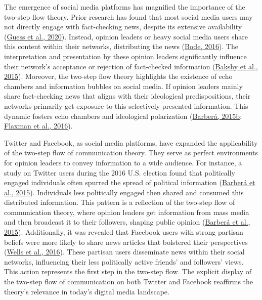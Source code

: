 \documentclass[
  12pt,
]{article}
\begin{document}
The emergence of social media platforms has magnified the importance of
the two-step flow theory. Prior research has found that most social
media users may not directly engage with fact-checking news, despite its
extensive availability (\protect\hyperlink{ref-guess2020exposure}{Guess
et al., 2020}). Instead, opinion leaders or heavy social media users
share this content within their networks, distributing the news
(\protect\hyperlink{ref-bode2016political}{Bode, 2016}). The
interpretation and presentation by these opinion leaders significantly
influence their network's acceptance or rejection of fact-checked
information (\protect\hyperlink{ref-bakshy2015exposure}{Bakshy et al.,
2015}). Moreover, the two-step flow theory highlights the existence of
echo chambers and information bubbles on social media. If opinion
leaders mainly share fact-checking news that aligns with their
ideological predispositions, their networks primarily get exposure to
this selectively presented information. This dynamic fosters echo
chambers and ideological polarization
(\protect\hyperlink{ref-barbera2015social}{Barberá, 2015b};
\protect\hyperlink{ref-flaxman2016filter}{Flaxman et al., 2016}).

Twitter and Facebook, as social media platforms, have expanded the
applicability of the two-step flow of communication theory. They serve
as perfect environments for opinion leaders to convey information to a
wide audience. For instance, a study on Twitter users during the 2016
U.S. election found that politically engaged individuals often spurred
the spread of political information
(\protect\hyperlink{ref-barbera2015tweeting}{Barberá et al., 2015}).
Individuals less politically engaged then shared and consumed this
distributed information. This pattern is a reflection of the two-step
flow of communication theory, where opinion leaders get information from
mass media and then broadcast it to their followers, shaping public
opinion (\protect\hyperlink{ref-barbera2015tweeting}{Barberá et al.,
2015}). Additionally, it was revealed that Facebook users with strong
partisan beliefs were more likely to share news articles that bolstered
their perspectives (\protect\hyperlink{ref-wells2016coproduction}{Wells
et al., 2016}). These partisan users disseminate news within their
social networks, influencing their less politically active friends' and
followers' views. This action represents the first step in the two-step
flow. The explicit display of the two-step flow of communication on both
Twitter and Facebook reaffirms the theory's relevance in today's digital
media landscape.
\end{document}
